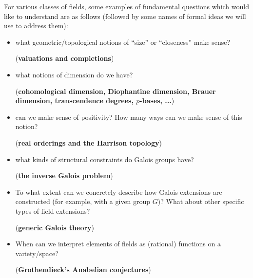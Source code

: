 \documentclass[12pt]{report}
\theoremstyle{plain}
\begin{document}
For various classes of fields, some examples of fundamental questions which
would like to understand are as follows (followed by some names of formal
ideas we will use to address them):
\begin{itemize}
\item what geometric/topological notions of ``size'' or ``closeness'' make
sense? 

(\textbf{valuations and completions})

\item what notions of dimension do we have? 

(\textbf{cohomological
dimension, Diophantine dimension, Brauer dimension, transcendence degrees,
$p$-bases, ...})

\item can we make sense of positivity? How many ways can we make sense of
this notion? 

(\textbf{real orderings and the Harrison topology})

\item what kinds of structural constraints do Galois groups have?

(\textbf{the inverse Galois problem})

\item To what extent can we concretely describe how Galois extensions are
constructed (for example, with a given group $G$)? What about other
specific types of field extensions? 

(\textbf{generic Galois theory})

\item When can we interpret elements of fields as (rational) functions on a
variety/space? 

(\textbf{Grothendieck's Anabelian conjectures})
\end{itemize}
\end{document}
